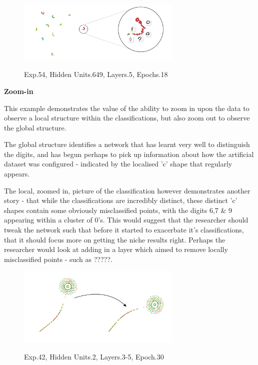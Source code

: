 \documentclass[a4paper,11pt,titlepage]{article}
\begin{document}
	\begin{figure}[H]
    			\centering	
			{{\includegraphics[width=0.7\textwidth]
    				{img/conc_X54_H649_L5_E18.png} 
    			}}%
    			\caption{Exp.54, Hidden Units.649, Layers.5, Epochs.18}%
    		\label{fig:mnistHinton}
	\end{figure}
	
	\textbf{Zoom-in}	
	\par 
	This example demonstrates the value of the ability to zoom in upon the data to observe a local structure within the classifications, but also zoom out to observe the global structure.
	\par 
	The global structure identifies a network that has learnt very well to distinguish the digits, and has begun perhaps to pick up information about how the artificial dataset was configured - indicated by the localised 'c' shape that regularly appears. 
	\par 
	The local, zoomed in, picture of the classification however demonstrates another story - that while the classifications are incredibly distinct, these distinct 'c' shapes contain some obviously misclassified points, with the digits 6,7 \& 9 appearing within a cluster of 0's. This would suggest that the researcher should tweak the network such that before it started to exacerbate it's classifications, that it should focus more on getting the niche results right. Perhaps the researcher would look at adding in a layer which aimed to remove locally misclassified points - such as ?????.
	
	\begin{figure}[H]
    			\centering	
			{{\includegraphics[width=0.7\textwidth]
    				{img/conc-X42_H2_L3-5_E30.png} 
    			}}%
    			\caption{Exp.42, Hidden Units.2, Layers.3-5, Epoch.30}%
    		\label{fig:mnistHinton}
	\end{figure}
	
\end{document}
